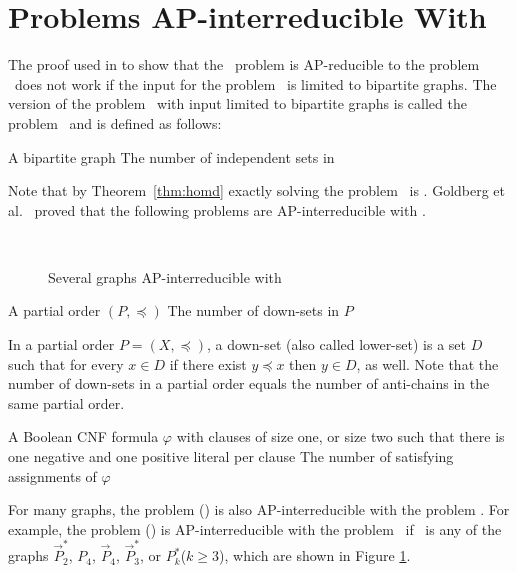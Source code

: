 \section{Problems AP-interreducible With \cbis} \label{sec:bis}
The proof used in \cite{Leslie03} to show that the \csat\ problem is AP-reducible
to the problem \cisp\ does 
not work if the input for the problem \cisp\ is limited to bipartite graphs.
The version of the problem \cisp\ with input limited to bipartite graphs is called
the problem \cbis\ and is defined as follows:

\pnndef%
{A bipartite graph \mG}
{The number of independent sets in \mG}

Note that by Theorem~\ref{thm:homd} exactly solving the problem \cbis\ is \cpc\@.
Goldberg et al.~\cite{Leslie03} proved that the following problems are AP-interreducible with \cbis\@.

\begin{figure}[h]
\centering
{}\hfill 
\subfigure[\ensuremath{P_4}]{\label{fig:p4}}\hfill
{}\\
{}\hfill
\subfigure[\ensuremath{P^*_k}]{\label{fig:psk}}
\caption{Several graphs AP-interreducible with \cbis}
\label{fig:bisred}
\end{figure} 

\pdef{\cdsp}
{A partial order \((P,\preceq)\)}
{The number of down-sets in \(P\)}

In a partial order \(P=(X,\preceq)\), a down-set (also called lower-set) is a set \(D\) such that 
for every \(x\in D\) if there exist \(y \preceq x\) then \(y\in D\), as well.
Note that the number of down-sets in a partial order equals
the number of anti-chains in the same partial order. 

{A Boolean CNF formula \(\varphi\) with clauses of size one, or size two such that
there is one negative and one positive literal per clause}
{The number of satisfying assignments of \(\varphi\)}


For many graphs, the problem \chom(\mH) is also AP-interreducible with the problem \cbis\@.
For example, the problem \chom(\mH) is AP-interreducible with the problem \cbis\ 
if \mH\ is any of the graphs \(\vec{P}^*_2\), \(P_4\), \(\vec{P}_4\), \(\vec{P}^*_3\),
or \(P^*_k\)(\(k\ge 3\)), which are shown in Figure \ref{fig:bisred}\@.
 
